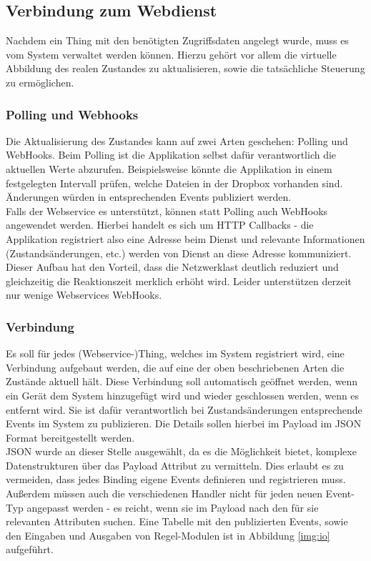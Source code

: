 \subsection{Verbindung zum Webdienst}
Nachdem ein Thing mit den benötigten Zugriffsdaten angelegt wurde, muss es vom System verwaltet werden können. Hierzu gehört vor allem die virtuelle Abbildung des realen Zustandes zu aktualisieren, sowie die tatsächliche Steuerung zu ermöglichen. 

\subsubsection{Polling und Webhooks}
Die Aktualisierung des Zustandes kann auf zwei Arten geschehen: Polling und WebHooks. Beim Polling ist die Applikation selbst dafür verantwortlich die aktuellen Werte abzurufen. Beispielsweise könnte die Applikation in einem festgelegten Intervall prüfen, welche Dateien in der Dropbox vorhanden sind. Änderungen würden in entsprechenden Events publiziert werden.\\

Falls der Webservice es unterstützt, können statt Polling auch WebHooks angewendet werden. Hierbei handelt es sich um HTTP Callbacks - die Applikation registriert also eine Adresse beim Dienst und relevante Informationen (Zustandsänderungen, etc.) werden von Dienst an diese Adresse kommuniziert. Dieser Aufbau hat den Vorteil, dass die Netzwerklast deutlich reduziert und gleichzeitig die Reaktionszeit merklich erhöht wird. Leider unterstützen derzeit nur wenige Webservices WebHooks.

\subsubsection{Verbindung}
Es soll für jedes (Webservice-)Thing, welches im System registriert wird, eine Verbindung aufgebaut werden, die auf eine der oben beschriebenen Arten die Zustände aktuell hält. Diese Verbindung soll automatisch geöffnet werden, wenn ein Gerät dem System hinzugefügt wird und wieder geschlossen werden, wenn es entfernt wird. Sie ist dafür verantwortlich bei Zustandsänderungen entsprechende Events im System zu publizieren. Die Details sollen hierbei im Payload im JSON Format bereitgestellt werden.\\

JSON wurde an dieser Stelle ausgewählt, da es die Möglichkeit bietet, komplexe Datenstrukturen über das Payload Attribut zu vermitteln. Dies erlaubt es zu vermeiden, dass jedes Binding eigene Events definieren und registrieren muss. Außerdem müssen auch die verschiedenen Handler nicht für jeden neuen Event-Typ angepasst werden - es reicht, wenn sie im Payload nach den für sie relevanten Attributen suchen. Eine Tabelle mit den publizierten Events, sowie den Eingaben und Ausgaben von Regel-Modulen ist in Abbildung \ref{img:io} aufgeführt.



